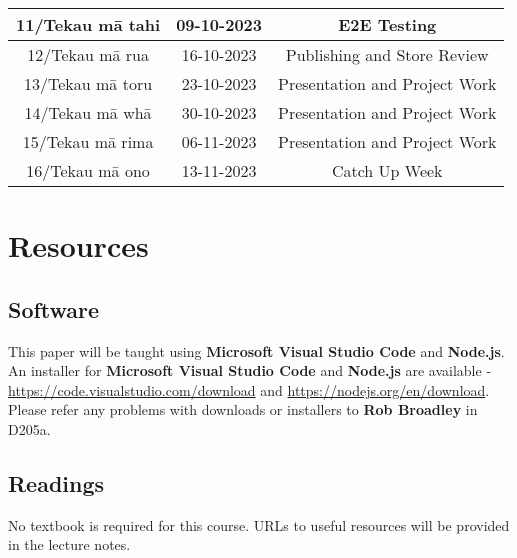 \documentclass{article}
\begin{document}
\begin{tabular}{|c|c|c|c|}
	\footnotesize 11/Tekau mā tahi & \footnotesize 09-10-2023 & \multicolumn{2}{c|}{\footnotesize E2E Testing}                                                                 \\ \hline
	\footnotesize 12/Tekau mā rua  & \footnotesize 16-10-2023 & \multicolumn{2}{c|}{\footnotesize Publishing and Store Review}                                                                 \\ \hline
	\footnotesize 13/Tekau mā toru & \footnotesize 23-10-2023 & \multicolumn{2}{c|}{\footnotesize Presentation and Project Work}                                                     \\ \hline
	\footnotesize 14/Tekau mā whā  & \footnotesize 30-10-2023 & \multicolumn{2}{c|}{\footnotesize Presentation and Project Work} \\ \hline 
	\footnotesize 15/Tekau mā rima & \footnotesize 06-11-2023 & \multicolumn{2}{c|}{\footnotesize Presentation and Project Work}                                                       \\ \hline
	\footnotesize 16/Tekau mā ono  & \footnotesize 13-11-2023 & \multicolumn{2}{c|}{\footnotesize Catch Up Week}                                                         \\ \hline
\end{tabular}

\section*{Resources}

\subsection*{Software}
This paper will be taught using \textbf{Microsoft Visual Studio Code} and \textbf{Node.js}. An installer for \textbf{Microsoft Visual Studio Code} and \textbf{Node.js} are available - \href{https://code.visualstudio.com/download}{https://code.visualstudio.com/download} and \href{https://nodejs.org/en/download}{https://nodejs.org/en/download}. Please refer any problems with downloads or installers to \textbf{Rob Broadley} in D205a.

\subsection*{Readings}
No textbook is required for this course. URLs to useful resources will be provided in the lecture notes. 
\end{document}
